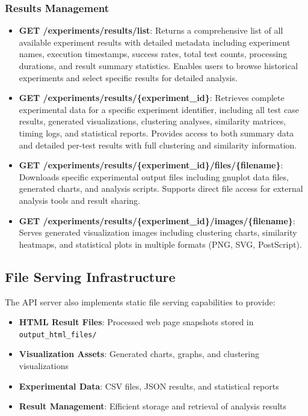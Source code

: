 \subsubsection{Results Management}
\begin{itemize}
    \item \textbf{GET /experiments/results/list}: Returns a comprehensive list of all available experiment results with detailed metadata including experiment names, execution timestamps, success rates, total test counts, processing durations, and result summary statistics. Enables users to browse historical experiments and select specific results for detailed analysis.
    \item \textbf{GET /experiments/results/\{experiment\_id\}}: Retrieves complete experimental data for a specific experiment identifier, including all test case results, generated visualizations, clustering analyses, similarity matrices, timing logs, and statistical reports. Provides access to both summary data and detailed per-test results with full clustering and similarity information.
    \item \textbf{GET /experiments/results/\{experiment\_id\}/files/\{filename\}}: Downloads specific experimental output files including gnuplot data files, generated charts, and analysis scripts. Supports direct file access for external analysis tools and result sharing.
    \item \textbf{GET /experiments/results/\{experiment\_id\}/images/\{filename\}}: Serves generated visualization images including clustering charts, similarity heatmaps, and statistical plots in multiple formats (PNG, SVG, PostScript).
\end{itemize}

\subsection{File Serving Infrastructure}
The API server also implements static file serving capabilities to provide:

\begin{itemize}
    \item \textbf{HTML Result Files}: Processed web page snapshots stored in \texttt{output\_html\_files/}
    \item \textbf{Visualization Assets}: Generated charts, graphs, and clustering visualizations
    \item \textbf{Experimental Data}: CSV files, JSON results, and statistical reports
    \item \textbf{Result Management}: Efficient storage and retrieval of analysis results
\end{itemize}

